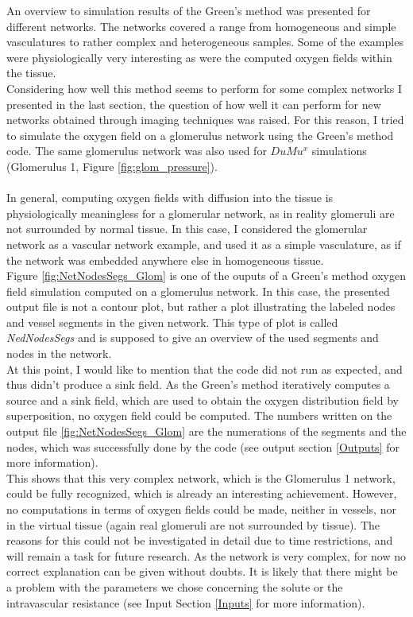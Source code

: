 An overview to simulation results of the Green's method was presented for different networks. The networks covered a range from homogeneous and simple vasculatures to rather complex and heterogeneous samples. Some of the examples were physiologically very interesting as were the computed oxygen fields within the tissue.
\\Considering how well this method seems to perform for some complex networks I presented in the last section, the question of how well it can perform for new networks obtained through imaging techniques was raised. For this reason, I tried to simulate the oxygen field on a glomerulus network using the Green's method code. The same glomerulus network was also used for $DuMu^x$ simulations (Glomerulus 1, Figure \ref{fig:glom_pressure}).\\
\\In general, computing oxygen fields with diffusion into the tissue is physiologically meaningless for a glomerular network, as in reality glomeruli are not surrounded by normal tissue. In this case, I considered the glomerular network as a vascular network example, and used it as a simple vasculature, as if the network was embedded anywhere else in homogeneous tissue.
\\Figure \ref{fig:NetNodesSegs_Glom} is one of the ouputs of a Green's method oxygen field simulation computed on a glomerulus network. In this case, the presented output file is not a contour plot, but rather a plot illustrating the labeled nodes and vessel segments in the given network. This type of plot is called \emph{NedNodesSegs} and is supposed to give an overview of the used segments and nodes in the network.
\\At this point, I would like to mention that the code did not run as expected, and thus didn't produce a sink field. As the Green's method iteratively computes a source and a sink field, which are used to obtain the oxygen distribution field by superposition, no oxygen field could be computed. The numbers written on the output file \ref{fig:NetNodesSegs_Glom} are the numerations of the segments and the nodes, which was successfully done by the code (see output section \ref{Outputs} for more information).
\\This shows that this very complex network, which is the Glomerulus 1 network, could be fully recognized, which is already an interesting achievement. However, no computations in terms of oxygen fields could be made, neither in vessels, nor in the virtual tissue (again real glomeruli are not surrounded by tissue). The reasons for this could not be investigated in detail due to time restrictions, and will remain a task for future research. As the network is very complex, for now no correct explanation can be given without doubts. It is likely that there might be a problem with the parameters we chose concerning the solute or the intravascular resistance (see Input Section \ref{Inputs} for more information).

